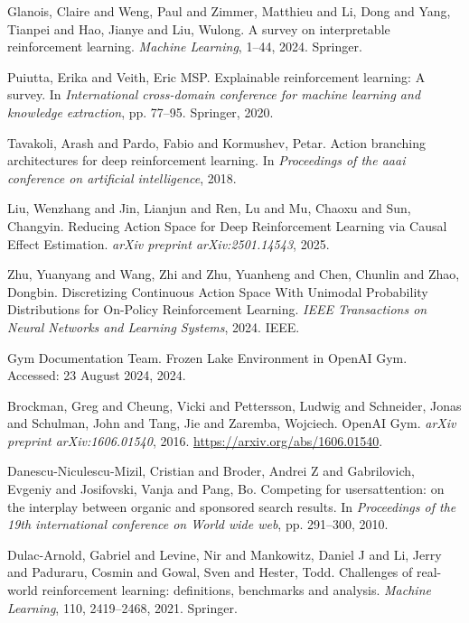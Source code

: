 \begin{thebibliography}{99}
 Glanois, Claire and Weng, Paul and Zimmer, Matthieu and Li, Dong and Yang, Tianpei and Hao, Jianye and Liu, Wulong. {A} survey on interpretable reinforcement learning. \textit{Machine Learning}, 1--44, 2024. Springer.

 Puiutta, Erika and Veith, Eric MSP. {E}xplainable reinforcement learning: {A} survey. In \textit{International cross-domain conference for machine learning and knowledge extraction}, pp. 77--95. Springer, 2020.

 Tavakoli, Arash and Pardo, Fabio and Kormushev, Petar. {A}ction branching architectures for deep reinforcement learning. In \textit{Proceedings of the aaai conference on artificial intelligence}, 2018.

 Liu, Wenzhang and Jin, Lianjun and Ren, Lu and Mu, Chaoxu and Sun, Changyin. {R}educing {A}ction {S}pace for {D}eep {R}einforcement {L}earning via {C}ausal {E}ffect {E}stimation. \textit{arXiv preprint arXiv:2501.14543}, 2025.

 Zhu, Yuanyang and Wang, Zhi and Zhu, Yuanheng and Chen, Chunlin and Zhao, Dongbin. {D}iscretizing {C}ontinuous {A}ction {S}pace {W}ith {U}nimodal {P}robability {D}istributions for {O}n-{P}olicy {R}einforcement {L}earning. \textit{IEEE Transactions on Neural Networks and Learning Systems}, 2024. IEEE.

 Gym Documentation Team. {F}rozen {L}ake {E}nvironment in {O}pen{A}I {G}ym. Accessed: 23 August 2024, 2024.

 Brockman, Greg and Cheung, Vicki and Pettersson, Ludwig and Schneider, Jonas and Schulman, John and Tang, Jie and Zaremba, Wojciech. {O}pen{A}I {G}ym. \textit{arXiv preprint arXiv:1606.01540}, 2016. \url{https://arxiv.org/abs/1606.01540}.

 Danescu-Niculescu-Mizil, Cristian and Broder, Andrei Z and Gabrilovich, Evgeniy and Josifovski, Vanja and Pang, Bo. {C}ompeting for users\textquotesingle  attention: on the interplay between organic and sponsored search results. In \textit{Proceedings of the 19th international conference on World wide web}, pp. 291--300, 2010.

 Dulac-Arnold, Gabriel and Levine, Nir and Mankowitz, Daniel J and Li, Jerry and Paduraru, Cosmin and Gowal, Sven and Hester, Todd. {C}hallenges of real-world reinforcement learning: definitions, benchmarks and analysis. \textit{Machine Learning}, 110, 2419--2468, 2021. Springer.


\end{thebibliography}
